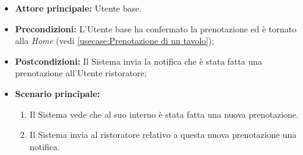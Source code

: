 \label{usecase:Notifica al ristoratore}
\begin{itemize}
	\item \textbf{Attore principale:} Utente base.
	
	\item \textbf{Precondizioni:} L'Utente base ha confermato la prenotazione ed è tornato alla \textit{Home} (vedi \autoref{usecase:Prenotazione di un tavolo});

    
	\item \textbf{Postcondizioni:} Il Sistema invia la notifica che è stata fatta una prenotazione all'Utente ristoratore;
     
	\item \textbf{Scenario principale:}
	      \begin{enumerate}
                \item Il Sistema vede che al suo interno è stata fatta una nuova prenotazione.
                \item Il Sistema invia al ristoratore relativo a questa nuova prenotazione una notifica.
	      \end{enumerate}
\end{itemize}